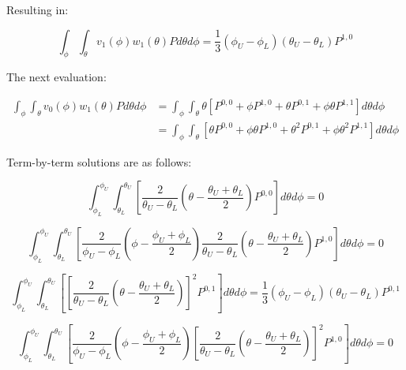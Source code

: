 \documentclass[12pt,a4paper,pagesize=pdftex]{scrartcl}
\begin{document}
Resulting in:

\begin{equation*}
    \int_\phi \int_\theta v_1\left(\phi\right) w_1\left(\theta\right) P d\theta d\phi = \boxed{\frac{1}{3} \left(\phi_U - \phi_L\right)\left(\theta_U - \theta_L\right) P^{1,0}}
\end{equation*}

The next evaluation:

\begin{align*}
    \int_\phi \int_\theta v_0\left(\phi\right) w_1\left(\theta\right) P d\theta d\phi & = \int_\phi \int_\theta \theta \left[P^{0,0} + \phi P^{1,0} + \theta P^{0,1} + \phi \theta P^{1,1}\right] d\theta d\phi \\
    & = \int_\phi \int_\theta \left[\theta P^{0,0} + \phi \theta P^{1,0} + \theta^2 P^{0,1} + \phi \theta^2 P^{1,1}\right] d\theta d\phi
\end{align*}

Term-by-term solutions are as follows:

\begin{equation*}
    \int_{\phi_L}^{\phi_U} \int_{\theta_L}^{\theta_U} \left[\frac{2}{\theta_U - \theta_L} \left(\theta - \frac{\theta_U + \theta_L}{2}\right) P^{0,0}\right] d\theta d\phi = 0
\end{equation*}

\begin{equation*}
    \int_{\phi_L}^{\phi_U} \int_{\theta_L}^{\theta_U} \left[\frac{2}{\phi_U - \phi_L} \left(\phi - \frac{\phi_U + \phi_L}{2}\right) \frac{2}{\theta_U - \theta_L} \left(\theta - \frac{\theta_U + \theta_L}{2}\right) P^{1,0}\right] d\theta d\phi = 0
\end{equation*}

\begin{equation*}
    \int_{\phi_L}^{\phi_U} \int_{\theta_L}^{\theta_U} \left[\left[\frac{2}{\theta_U - \theta_L} \left(\theta - \frac{\theta_U + \theta_L}{2}\right)\right]^2 P^{0,1}\right] d\theta d\phi = \frac{1}{3}\left(\phi_U - \phi_L\right) \left(\theta_U - \theta_L\right) P^{0,1}
\end{equation*}

\begin{equation*}
    \int_{\phi_L}^{\phi_U} \int_{\theta_L}^{\theta_U} \left[\frac{2}{\phi_U - \phi_L} \left(\phi - \frac{\phi_U + \phi_L}{2}\right) \left[\frac{2}{\theta_U - \theta_L} \left(\theta - \frac{\theta_U + \theta_L}{2}\right)\right]^2 P^{1,0}\right] d\theta d\phi = 0
\end{equation*}
\end{document}
